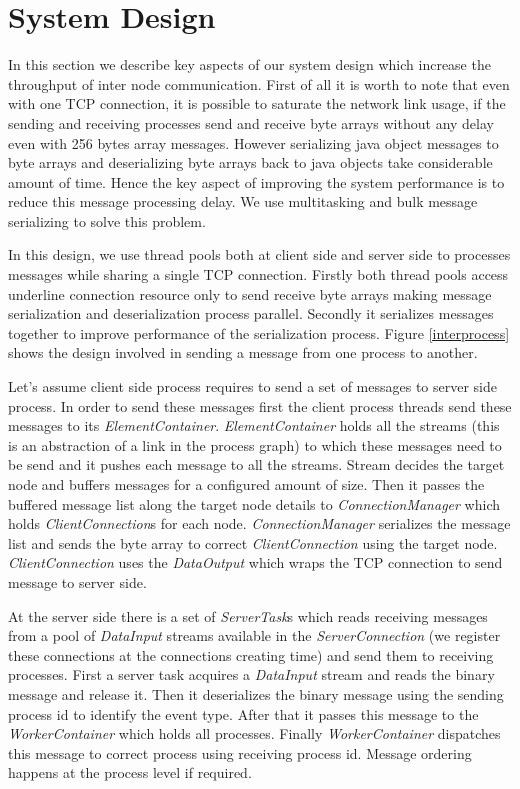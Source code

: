 \section{System Design}
In this section we describe key aspects of our system design which increase the throughput of inter node communication. First of all it is worth to note that even with one TCP connection, it is possible to saturate the network link usage, if the sending and receiving processes send and receive byte arrays without any delay even with 256 bytes array messages. However serializing java object messages to byte arrays and deserializing byte arrays back to java objects take considerable amount of time. Hence the key aspect of  improving the system performance is to reduce this message processing delay. We use multitasking and bulk message serializing to solve this problem. 

In this design, we use thread pools both at client side and server side to processes messages while sharing a single TCP connection. Firstly both thread pools access underline connection resource only to send receive byte arrays making message serialization and deserialization process parallel. Secondly it serializes messages together to improve performance of the serialization process.  Figure \ref{interprocess} shows the design involved in sending a message from one process to another. 

Let's assume client side process requires to send a set of messages to server side process. In order to send these messages first the client process threads send these messages to its \textit{ElementContainer}. \textit{ElementContainer} holds all the streams (this is an abstraction of a link in the process graph) to which these messages need to be send and it pushes each message to all the streams. Stream decides the target node and buffers messages for a configured amount of size. Then it passes the buffered  message list along the target node details to \textit{ConnectionManager} which holds \textit{ClientConnection}s for each node. \textit{ConnectionManager} serializes the message list and sends the byte array to correct \textit{ClientConnection} using the target node. \textit{ClientConnection} uses the \textit{DataOutput} which wraps the TCP connection to send message to server side. 

At the server side there is a set of \textit{ServerTask}s which reads receiving messages from a pool of \textit{DataInput} streams available in the \textit{ServerConnection} (we register these connections at the connections creating time) and send them to receiving processes. First a server task acquires a \textit{DataInput} stream and reads the binary message and release it. Then it deserializes the binary message using the sending process id to identify the event type.  After that it passes this message to the \textit{WorkerContainer} which holds all processes. Finally \textit{WorkerContainer} dispatches this message to correct process using receiving process id. Message ordering happens at the process level if required. 

